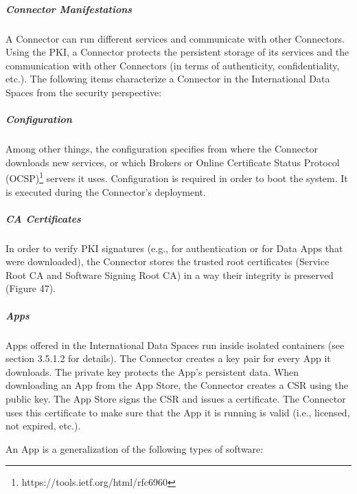 \subparagraph*{Connector Manifestations \\}
A Connector can run different services and communicate with other Connectors. Using the PKI, a Connector protects the persistent storage of its services and the communication with other Connectors (in terms of authenticity, confidentiality, etc.). The following items characterize a Connector in the International Data Spaces from the security perspective:

\subparagraph*{Configuration \\}

Among other things, the configuration specifies from where the Connector downloads new services, or which Brokers or Online Certificate Status Protocol (OCSP)\footnote{ https://tools.ietf.org/html/rfc6960 } servers it uses. Configuration is required in order to boot the system. It is executed during the Connector’s deployment.

\subparagraph*{CA Certificates \\}

In order to verify PKI signatures (e.g., for authentication or for Data Apps that were downloaded), the Connector stores the trusted root certificates (Service Root CA and Software Signing Root CA) in a way their integrity is preserved (Figure 47).

\subparagraph*{Apps \\}
Apps offered in the International Data Spaces run inside isolated containers (see section 3.5.1.2 for details). The Connector creates a key pair for every App it downloads. The private key protects the App’s persistent data. When downloading an App from the App Store, the Connector creates a CSR using the public key. The App Store signs the CSR and issues a certificate. The Connector uses this certificate to make sure that the App it is running is valid (i.e., licensed, not expired, etc.).

An App is a generalization of the following types of software:

